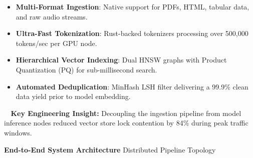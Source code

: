 \documentclass[20pt,landscape,a4paper]{foils}
\newcommand{\SlideHeader}[2]{%
  \begin{tcolorbox}[headerbox]
    {\Huge\bfseries #1} \hfill {\large\textcolor{SlateBorder}{#2}}
  \end{tcolorbox}
  \vspace{6pt}
}
\begin{document}
\begin{itemize}[leftmargin=20pt, label=\textcolor{NavyPrimary}{\small\faCheck}]
  \item \textbf{Multi-Format Ingestion}: Native support for PDFs, HTML, tabular data, and raw audio streams.
  \item \textbf{Ultra-Fast Tokenization}: Rust-backed tokenizers processing over 500,000 tokens/sec per GPU node.
  \item \textbf{Hierarchical Vector Indexing}: Dual HNSW graphs with Product Quantization (PQ) for sub-millisecond search.
  \item \textbf{Automated Deduplication}: MinHash LSH filter delivering a 99.9\% clean data yield prior to model embedding.
\end{itemize}

\vspace{6pt}
\begin{tcolorbox}[accentbox]
  \textcolor{NavyPrimary}{\textbf{\faLightbulb~ Key Engineering Insight:}} \small Decoupling the ingestion pipeline from model inference nodes reduced vector store lock contention by 84\% during peak traffic windows.
\end{tcolorbox}
\pagebreak

\SlideHeader{End-to-End System Architecture}{Distributed Pipeline Topology}
\end{document}

